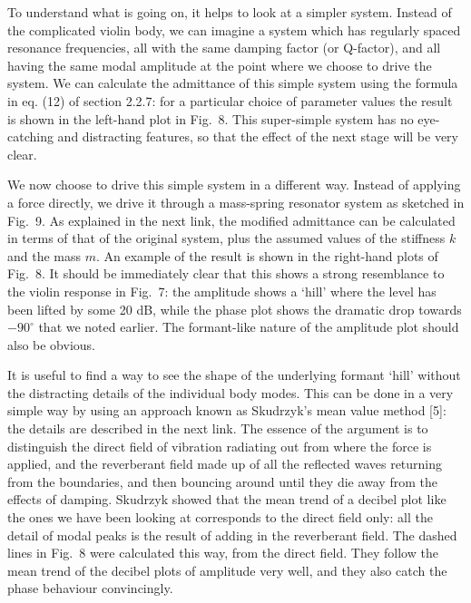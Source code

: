 
  To understand what is going on, it helps to look at a simpler system. Instead 
  of the complicated violin body, we can imagine a system which has regularly 
  spaced resonance frequencies, all with the same damping factor (or Q-factor), 
  and all having the same modal amplitude at the point where we choose to drive 
  the system. We can calculate the admittance of this simple system using the 
  formula in eq. (12) of section 2.2.7: for a particular choice of parameter 
  values the result is shown in the left-hand plot in Fig.\ 8. This 
  super-simple system has no eye-catching and distracting features, so that the 
  effect of the next stage will be very clear. 

  We now choose to drive this simple system in a different way. Instead of 
  applying a force directly, we drive it through a mass-spring resonator system 
  as sketched in Fig.\ 9. As explained in the next link, the modified 
  admittance can be calculated in terms of that of the original system, plus 
  the assumed values of the stiffness $k$ and the mass $m$. An example of the 
  result is shown in the right-hand plots of Fig.\ 8. It should be immediately 
  clear that this shows a strong resemblance to the violin response in Fig.\ 7: 
  the amplitude shows a `hill' where the level has been lifted by some 20 dB, 
  while the phase plot shows the dramatic drop towards $-90^\circ$ that we 
  noted earlier. The formant-like nature of the amplitude plot should also be 
  obvious. 


  It is useful to find a way to see the shape of the underlying formant `hill' 
  without the distracting details of the individual body modes. This can be 
  done in a very simple way by using an approach known as Skudrzyk’s mean value 
  method [5]: the details are described in the next link. The essence of the 
  argument is to distinguish the direct field of vibration radiating out from 
  where the force is applied, and the reverberant field made up of all the 
  reflected waves returning from the boundaries, and then bouncing around until 
  they die away from the effects of damping. Skudrzyk showed that the mean 
  trend of a decibel plot like the ones we have been looking at corresponds to 
  the direct field only: all the detail of modal peaks is the result of adding 
  in the reverberant field. The dashed lines in Fig.\ 8 were calculated this 
  way, from the direct field. They follow the mean trend of the decibel plots 
  of amplitude very well, and they also catch the phase behaviour convincingly. 

